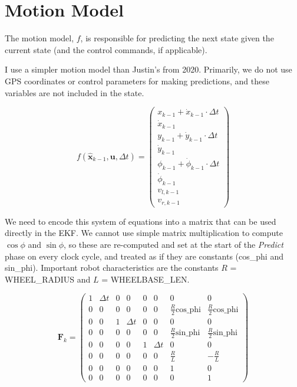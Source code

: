 \section{Motion Model}

The motion model, $f$, is responsible for predicting the next state given the current state (and the control commands, if applicable).

I use a simpler motion model than Justin's from 2020. Primarily, we do not use GPS coordinates or control parameters for making predictions, and these variables are not included in the state.

\begin{equation}
    f(\boldsymbol{\hat{x}}_{k-1}, \boldsymbol{u}, \Delta t) = 
    \begin{pmatrix}
    x_{k-1} + \dot{x}_{k-1} \cdot \Delta t \\
    \dot{x}_{k-1} \\
    y_{k-1} + \dot{y}_{k-1} \cdot \Delta t \\
    \dot{y}_{k-1} \\
    \phi_{k-1} + \dot{\phi}_{k-1} \cdot \Delta t \\
    \dot{\phi}_{k-1} \\
    v_{l,k-1} \\
    v_{r,k-1}
    \end{pmatrix}
\end{equation}

We need to encode this system of equations into a matrix that can be used directly in the EKF. We cannot use simple matrix multiplication to compute $\cos{\phi}$ and $\sin{\phi}$, so these are re-computed and set at the start of the \textit{Predict} phase on every clock cycle, and treated as if they are constants (cos\_phi and sin\_phi). Important robot characteristics are the constants $R$ = WHEEL\_RADIUS and $L$ = WHEELBASE\_LEN.

\begin{equation}
    \boldsymbol{F}_{k} =
    \begin{pmatrix}
    1 & \Delta t & 0 & 0 & 0 & 0 & 0 & 0 \\
    0 & 0 & 0 & 0 & 0 & 0 & \frac{R}{2} \textrm{cos\_phi} & \frac{R}{2} \textrm{cos\_phi} \\
    0 & 0 & 1 & \Delta t & 0 & 0 & 0 & 0 \\
    0 & 0 & 0 & 0 & 0 & 0 & \frac{R}{2} \textrm{sin\_phi} & \frac{R}{2} \textrm{sin\_phi} \\
    0 & 0 & 0 & 0 & 1 & \Delta t & 0 & 0 \\
    0 & 0 & 0 & 0 & 0 & 0 & \frac{R}{L} & -\frac{R}{L} \\
    0 & 0 & 0 & 0 & 0 & 0 & 1 & 0 \\
    0 & 0 & 0 & 0 & 0 & 0 & 0 & 1
    \end{pmatrix}
\end{equation}

